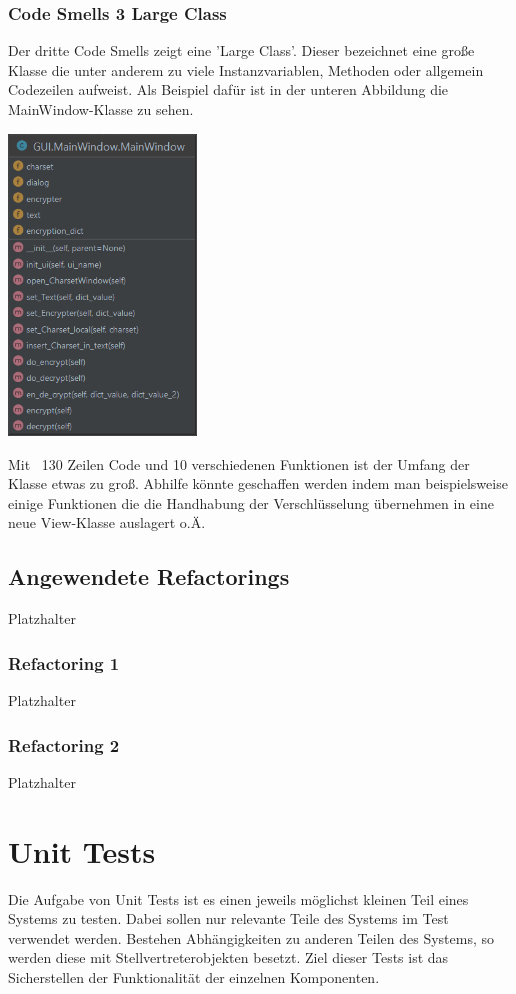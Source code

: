 \documentclass[12pt]{article}
\begin{document}
\subsubsection{Code Smells 3 Large Class}
Der dritte Code Smells zeigt eine 'Large Class'. Dieser bezeichnet eine große Klasse die unter anderem zu viele Instanzvariablen, Methoden oder allgemein Codezeilen aufweist. Als Beispiel dafür ist in der unteren Abbildung die MainWindow-Klasse zu sehen.
\begin{center}
	\includegraphics[width=5cm]{bilder/CodeSmells3.png}
\end{center}
Mit ~130 Zeilen Code und 10 verschiedenen Funktionen ist der Umfang der Klasse etwas zu groß. Abhilfe könnte geschaffen werden indem man beispielsweise einige Funktionen die die Handhabung der Verschlüsselung übernehmen in eine neue View-Klasse auslagert o.Ä.

\subsection{Angewendete Refactorings}
Platzhalter

\subsubsection{Refactoring 1}
Platzhalter

\subsubsection{Refactoring 2}
Platzhalter

\newpage

\section{Unit Tests}
Die Aufgabe von Unit Tests ist es einen jeweils möglichst kleinen Teil eines Systems zu testen. Dabei sollen nur relevante Teile des Systems im Test verwendet werden. Bestehen Abhängigkeiten zu anderen Teilen des Systems, so werden diese mit Stellvertreterobjekten besetzt. Ziel dieser Tests ist das Sicherstellen der Funktionalität der einzelnen Komponenten.
\end{document}
